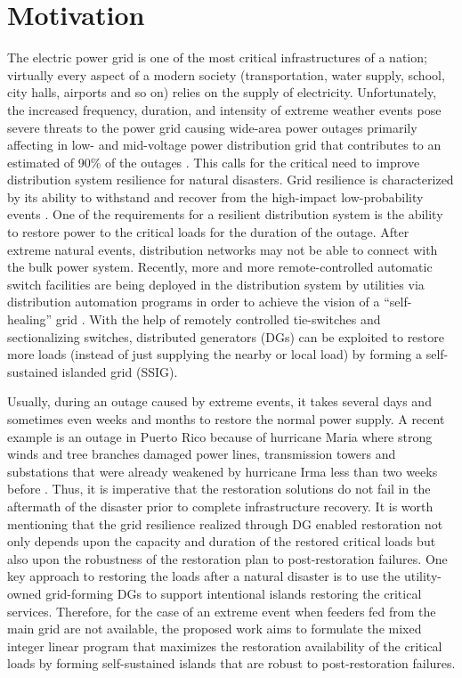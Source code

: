 \documentclass[12pt]{article}
\begin{document}
\section{Motivation}
 The electric power grid is one of the most critical infrastructures of a nation; virtually every aspect of a modern society (transportation, water supply, school, city halls, airports and so on) relies on the supply of electricity. Unfortunately, the increased frequency, duration, and intensity of extreme weather events pose severe threats to the power grid causing wide-area power outages primarily affecting in low- and mid-voltage power distribution grid that contributes to an estimated of 90\% of the outages \cite{farhangi2010path}. This calls for the critical need to improve distribution system resilience for natural disasters. Grid resilience is characterized by its ability to withstand and recover from the high-impact low-probability events \cite{panteli2015grid}. One of the requirements for a resilient distribution system is the ability to restore power to the critical loads for the duration of the outage.
 After extreme natural events, distribution networks may not be able to connect with the bulk power system. Recently, more and more remote-controlled automatic switch facilities are being deployed in the distribution system by utilities via distribution automation programs in order to achieve the vision of a ``self-healing'' grid \cite{program}.  With the help of remotely controlled tie-switches and sectionalizing switches, distributed generators (DGs) can be exploited to restore more loads (instead of just supplying the nearby or local load) by forming a self-sustained islanded grid (SSIG). 
  
  Usually, during an outage caused by extreme events, it takes several days and sometimes even weeks and months to restore the normal power supply. A recent example is an outage in Puerto Rico because of hurricane Maria where strong winds and tree branches damaged power lines, transmission towers and substations that were already weakened by hurricane Irma less than two weeks before \cite{irma}. Thus, it is imperative that the restoration solutions do not fail in the aftermath of the disaster prior to complete infrastructure recovery. It is worth mentioning that the  grid  resilience  realized  through  DG  enabled restoration  not  only  depends  upon  the  capacity  and  duration of  the  restored  critical  loads  but  also  upon  the  robustness  of the  restoration  plan  to  post-restoration  failures. One key approach to restoring the loads after a natural disaster is to use the utility-owned grid-forming DGs to support intentional islands restoring the critical services. Therefore, for the case of an extreme event when feeders fed from the main grid are not available, the proposed work aims to formulate the mixed integer linear program that maximizes the restoration availability of the critical loads by forming self-sustained  islands  that  are  robust to  post-restoration  failures.
  
\end{document}
